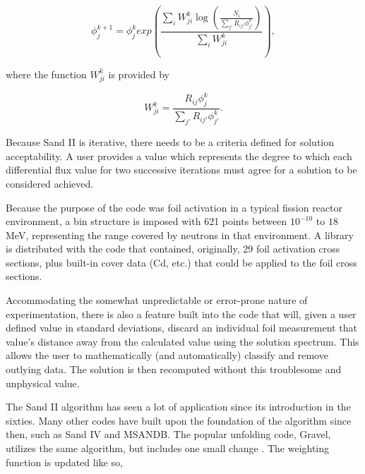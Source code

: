 \begin{equation}
\label{eqn:sandii}
\phi_j^{k + 1} = \phi_j^{k} exp(\frac{\sum_i W_{ji}^k \log(\frac{N_i}{\sum_{j'} R_{ij'} \phi_{j'}^k})}{\sum_i W_{ji}^k}) ,
\end{equation}

\noindent
where the function $W_{ji}^k$ is provided by

\begin{equation}
\label{eqn:sandii-w}
W_{ji}^k = \frac{R_{ij} \phi_{j}^k}{\sum_{j'} R_{ij'} \phi_{j'}^k} .
\end{equation}

Because Sand II is iterative, there needs to be a criteria defined for solution acceptability.
A user provides a value which represents the degree to which each differential flux value for two successive iterations must agree for a solution to be considered achieved.

Because the purpose of the code was foil activation in a typical fission reactor environment, a bin structure is imposed with 621 points between $10^{-10}$ to $18$ MeV, representing the range covered by neutrons in that environment.
A library is distributed with the code that contained, originally, 29 foil activation cross sections, plus built-in cover data (Cd, etc.) that could be applied to the foil cross sections.

Accommodating the somewhat unpredictable or error-prone nature of experimentation, there is also a feature built into the code that will, given a user defined value in standard deviations, discard an individual foil measurement that value's distance away from the calculated value using the solution spectrum.
This allows the user to mathematically (and automatically) classify and remove outlying data.
The solution is then recomputed without this troublesome and unphysical value.

The Sand II algorithm has seen a lot of application since its introduction in the sixties.
Many other codes have built upon the foundation of the algorithm since then, such as Sand IV and MSANDB.
The popular unfolding code, Gravel, utilizes the same algorithm, but includes one small change \cite{reginatto2004umg}.
The weighting function is updated like so,

